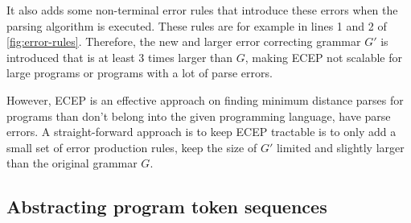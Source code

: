 It also adds some non-terminal error rules that introduce these errors when the
parsing algorithm is executed. These rules are for example in lines 1 and 2 of
\autoref{fig:error-rules}. Therefore, the new and larger error correcting
grammar $G'$ is introduced that is at least 3 times larger than $G$, making ECEP
not scalable for large programs or programs with a lot of parse errors.

However, ECEP is an effective approach on finding minimum distance parses for
programs than don't belong into the given programming language, \ie have parse
errors. A straight-forward approach is to keep ECEP tractable is to only add a
small set of error production rules, \ie keep the size of $G'$ limited and
slightly larger than the original grammar $G$.







\subsection{Abstracting program token sequences}
\label{sec:overview:abstraction}

